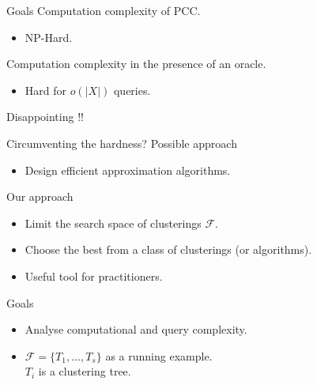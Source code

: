 \documentclass{beamer}
\newcommand{\mc}{\mathcal}
\begin{document}
\begin{frame}{Goals}
	Computation complexity of PCC.
	\begin{itemize}
		\vspace{10pt}\item NP-Hard.
	\end{itemize}	 
	\vspace{10pt}Computation complexity in the presence of an oracle.
	\begin{itemize}
		\vspace{10pt}\item Hard for $o(|X|)$ queries.
	\end{itemize}

    \Huge{
    \begin{center}
    	Disappointing !!\\
    	\Frowny{} 
   	\end{center}
    }
\end{frame}

\begin{frame}{Circumventing the hardness?}
	Possible approach
	\begin{itemize}
		\item Design efficient approximation algorithms.		
	\end{itemize}
	
	\vspace{30pt}Our approach
	\begin{itemize}
		\vspace{5pt}\item Limit the search space of clusterings $\mc F$.
		\vspace{5pt}\item Choose the best from a class of clusterings (or algorithms).
		\vspace{5pt}\item Useful tool for practitioners. 
	\end{itemize}
\end{frame}

\begin{frame}{Goals}
	\begin{itemize}
		\item Analyse computational and query complexity.
		\vspace{30pt}\item $\mc F = \{T_1, \ldots, T_s\}$ as a running example.\\
		\vspace{10pt}$T_i$ is a clustering tree.
	\end{itemize}
\end{frame}
\end{document}
